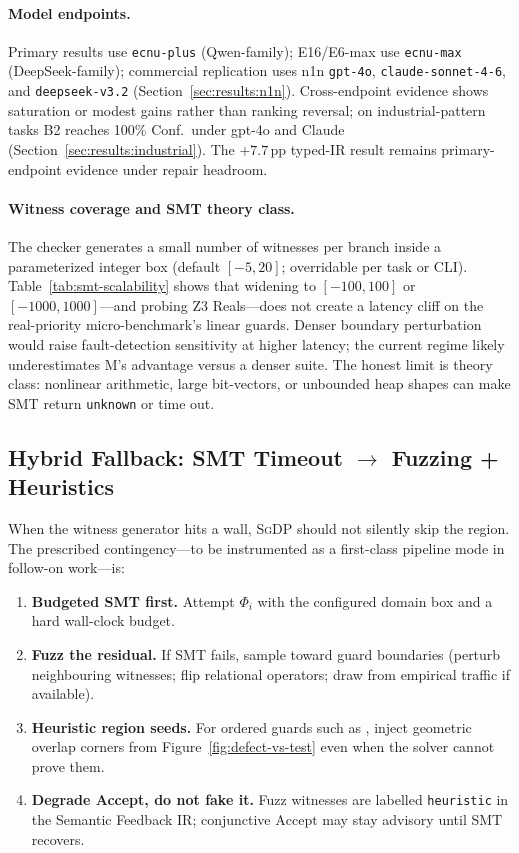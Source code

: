 \paragraph{Model endpoints.}
Primary results use \texttt{ecnu-plus} (Qwen-family); E16/E6-max use
\texttt{ecnu-max} (DeepSeek-family); commercial replication uses n1n
\texttt{gpt-4o}, \texttt{claude-sonnet-4-6}, and \texttt{deepseek-v3.2}
(Section~\ref{sec:results:n1n}).
Cross-endpoint evidence shows saturation or modest gains rather than ranking
reversal; on industrial-pattern tasks B2 reaches 100\% Conf.\ under gpt-4o and
Claude (Section~\ref{sec:results:industrial}).
The ${+}7.7$\,pp typed-IR result remains primary-endpoint evidence under
repair headroom.

\paragraph{Witness coverage and SMT theory class.}
The checker generates a small number of witnesses per branch inside a
parameterized integer box (default $[-5,20]$; overridable per task or CLI).
Table~\ref{tab:smt-scalability} shows that widening to $[-100,100]$ or
$[-1000,1000]$---and probing Z3 Reals---does not create a latency cliff on
the real-priority micro-benchmark's linear guards.
Denser boundary perturbation would raise fault-detection sensitivity at higher
latency; the current regime likely underestimates M's advantage versus a denser
suite.
The honest limit is theory class: nonlinear arithmetic, large bit-vectors, or
unbounded heap shapes can make SMT return \texttt{unknown} or time out.

\subsection{Hybrid Fallback: SMT Timeout $\to$ Fuzzing + Heuristics}
\label{sec:disc:smt-hybrid}

When the witness generator hits a wall, \textsc{SgDP} should not silently skip
the region.
The prescribed contingency---to be instrumented as a first-class pipeline mode
in follow-on work---is:

\begin{enumerate}
  \item \textbf{Budgeted SMT first.} Attempt $\Phi_i$ with the configured
        domain box and a hard wall-clock budget.
  \item \textbf{Fuzz the residual.} If SMT fails, sample toward guard
        boundaries (perturb neighbouring witnesses; flip relational operators;
        draw from empirical traffic if available).
  \item \textbf{Heuristic region seeds.} For ordered guards such as
        , inject geometric overlap corners from
        Figure~\ref{fig:defect-vs-test} even when the solver cannot prove them.
  \item \textbf{Degrade Accept, do not fake it.} Fuzz witnesses are labelled
        \texttt{heuristic} in the Semantic Feedback IR; conjunctive
        $\mathrm{Accept}$ may stay advisory until SMT recovers.
\end{enumerate}


